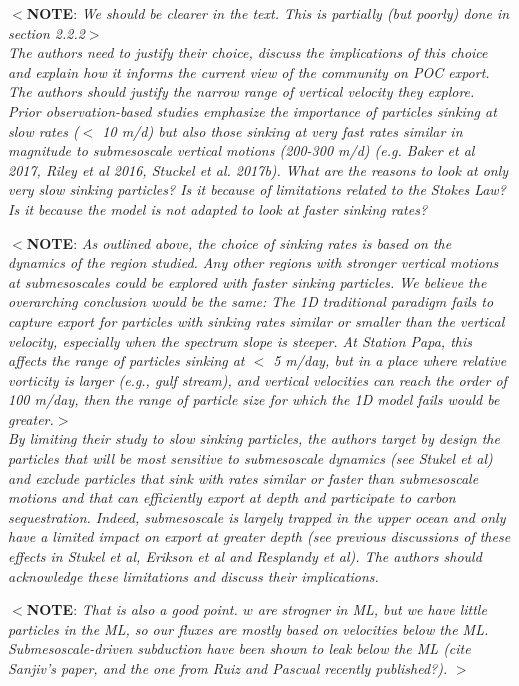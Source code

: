 \documentclass[12pt,letter]{article}
\newcommand{\note}[1]{\color{red}$<$\textbf{NOTE}: \textit{#1}$>$\color{black}}
\begin{document}
\note{We should be clearer in the text. This is partially (but poorly) done in section 2.2.2}\\
	
\textit{The authors need to justify their choice, discuss the implications of this choice and explain how it informs the current view of the community on POC export. The authors should justify the narrow range of vertical velocity they explore. Prior observation-based studies emphasize the importance of particles sinking at slow rates ($<$ 10 m/d) but also those sinking at very fast rates similar in magnitude to submesoscale vertical motions (200-300 m/d) (e.g. Baker et al 2017, Riley et al 2016, Stuckel et al. 2017b). What are the reasons to look at only very slow sinking particles? Is it because of limitations related to the Stokes Law? Is it because the model is not adapted to look at faster sinking rates?\\}

\note{As outlined above, the choice of sinking rates is based on the dynamics of the region studied. Any other regions with stronger vertical motions at submesoscales could be explored with faster sinking particles. We believe the overarching conclusion would be the same: The 1D traditional paradigm fails to capture export for particles with sinking rates similar or smaller than the vertical velocity, especially when the spectrum slope is steeper. At Station Papa, this affects the range of particles sinking at $<$ 5 m/day, but in a place where relative vorticity is larger (e.g., gulf stream), and vertical velocities can reach the order of 100 m/day, then the range of particle size for which the 1D model fails would be greater.}\\

\textit{By limiting their study to slow sinking particles, the authors target by design the particles that will be most sensitive to submesoscale dynamics (see Stukel et al) and exclude particles that sink with rates similar or faster than submesoscale motions and that can efficiently export at depth and participate to carbon sequestration. Indeed, submesoscale is largely trapped in the upper ocean and only have a limited impact on export at greater depth (see previous discussions of these effects in Stukel et al, Erikson et al and Resplandy et al). The authors should acknowledge these limitations and discuss their implications.\\}

\note{That is also a good point. $w$ are strogner in ML, but we have little particles in the ML, so our fluxes are mostly based on velocities below the ML. Submesoscale-driven subduction have been shown to leak below the ML (cite Sanjiv's paper, and the one from Ruiz and Pascual recently published?). }\\
\end{document}
